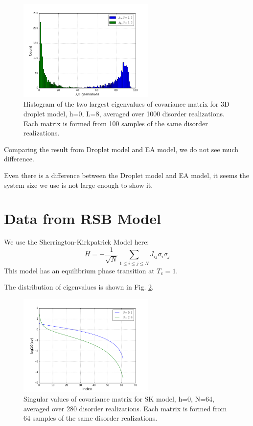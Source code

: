 \begin{figure}[ht]
  \centering
  \includegraphics[width=0.6\textwidth]{img/matrix/eigDropletDist.png}
  \caption{Histogram of the two largest eigenvalues of covariance matrix for 3D droplet model, h=0, L=8, 
averaged over 1000 disorder realizations. 
Each matrix is formed from 100 samples of the same disorder realizations.}
  \label{fig:eigDropletDist}
\end{figure}

Comparing the result from Droplet model and EA model, we do not see much difference.

Even there is a difference between the Droplet model and EA model, it seems 
the system size we use is not large enough to show it.

\section{Data from RSB Model }
We use the Sherrington-Kirkpatrick Model here:
\[
H=-\frac{1}{\sqrt{N}}\sum_{1\le i \le j \le N} J_{ij}\sigma_i\sigma_j
\]
This model has an equilibrium phase transition at $T_c=1$. 


The distribution of eigenvalues is shown in Fig. \ref{fig:eigRSB}.

\begin{figure}[ht]
  \centering
  \includegraphics[width=0.6\textwidth]{img/matrix/svdDistRSB.png}
  \caption{Singular values of covariance matrix for SK model, h=0, N=64, 
averaged over 280 disorder realizations. 
Each matrix is formed from 64 samples of the same disorder realizations.}
  \label{fig:eigRSB}
\end{figure}

